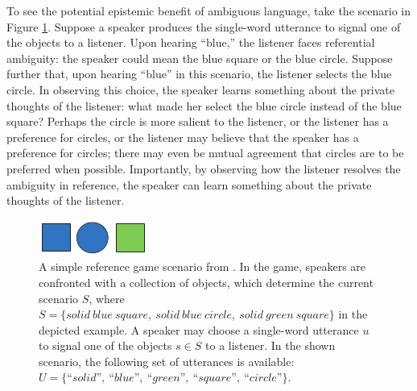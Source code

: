 \documentclass[11pt,a4paper]{article}
\begin{document}


To see the potential epistemic benefit of ambiguous language, take the scenario in Figure \ref{FG-ref-game}.
Suppose a speaker produces the single-word utterance to signal one of the objects to a listener. Upon hearing ``blue,'' the listener faces referential ambiguity: the speaker could mean the blue square or the blue circle. 
Suppose further that, upon hearing ``blue'' in this scenario, the listener selects the blue circle.
In observing this choice, the speaker learns something about the private thoughts of the listener: what made her select the blue circle instead of the blue square? Perhaps the circle is more salient to the listener, or the listener has a preference for circles, or the listener may believe that the speaker has a preference for circles; there may even be mutual agreement that circles are to be preferred when possible. Importantly, by observing how the listener resolves the ambiguity in reference, the speaker can learn something about the private thoughts of the listener.


\begin{figure}
	\centering
	\includegraphics[width=.5\linewidth]{images/rsascene-eps-converted-to.pdf}
	\caption{A simple reference game scenario from \protect{}.
		In the game, speakers are confronted with a collection of objects, which determine the current scenario $S$, where $S=\{solid\ blue\ square,\ solid\ blue\ circle,\ solid\ green\ square\}$ in the depicted example. 
		A speaker may choose a single-word utterance $u$ to signal one of the objects $s\in S$ to a listener.
		In the shown scenario, the following set of utterances is available: $U =\{\textit{``solid''},\ \textit{``blue''},\ \textit{``green''},\ \textit{``square''},\ \textit{``circle''}\}$.
		}
	\label{FG-ref-game}
\end{figure}
\end{document}
